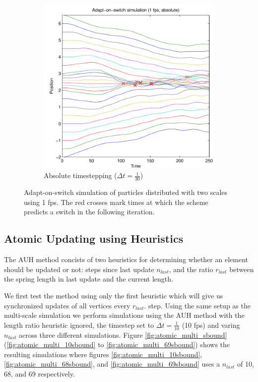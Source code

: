 \documentclass[11pt]{article}
\begin{document}
\begin{figure}[H]
\begin{subfigure}[t]{0.5\textwidth}
        \includegraphics[width=\textwidth]{../images/switch_multiscale_1fps_absolute.pdf}
        \caption{Absolute timestepping ($\Delta t = \frac{1}{30}$)}
        \label{fig:switch_multi_1fps_absolute}
    \end{subfigure}
    \caption{Adapt-on-switch simulation of particles distributed with two
scales using 1 fps. The red crosses mark times at which the scheme predicts a
switch in the following iteration.}
    \label{fig:switch}
\end{figure}

\subsection{Atomic Updating using Heuristics}
\label{sec:experiments_atomic}
The AUH method concists of two heuristics for determining whether an element
should be updated or not: steps since last update $n_{last}$, and the ratio
$r_{last}$ between the spring length in last update and the current length.

We first test the method using only the first heuristic which will give us
synchronized updates of all vertices every $r_{last}$. step. Using the same
setup as the multi-scale simulation we perform simulations using the AUH method
with the length ratio heuristic ignored, the timestep set to $\Delta t =
\frac{1}{10}$ (10 fps) and varing $n_{last}$ across three different simulations.
Figure \ref{fig:atomic_multi_sbound} (\ref{fig:atomic_multi_10sbound} to
\ref{fig:atomic_multi_69sbound}) shows the resulting simulations where
figures \ref{fig:atomic_multi_10sbound}, \ref{fig:atomic_multi_68sbound},
and \ref{fig:atomic_multi_69sbound} uses a $n_{last}$ of 10, 68, and 69
respectively.
\end{document}

